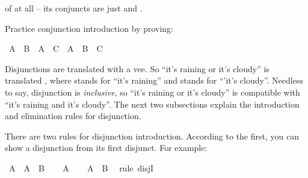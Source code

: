 \begin{isabellebody}
\begin{isamarkuptext}
of  at all -- its conjuncts are just  and .%
\end{isamarkuptext}\isamarkuptrue%
%
\begin{isamarkuptext}%
\begin{Exercise} Practice conjunction introduction by proving: \end{Exercise}%
\end{isamarkuptext}\isamarkuptrue%
\isamarkupfalse%
\ {\isachardoublequoteopen}{\isacharparenleft}A\ {\isasymlongrightarrow}\ B{\isacharparenright}\ {\isasymlongrightarrow}\ {\isacharparenleft}A\ {\isasymlongrightarrow}\ C{\isacharparenright}\ {\isasymlongrightarrow}\ A\ {\isasymlongrightarrow}\ B\ {\isasymand}\ C{\isachardoublequoteclose}%
\isadelimproof
\ %
\endisadelimproof
%
\isatagproof
{}\isamarkupfalse%
%
\endisatagproof
{\isafoldproof}%
%
\isadelimproof
%
\endisadelimproof
%
\isamarkuptrue%
%
\begin{isamarkuptext}%
Disjunctions are translated with a vee. So ``it's raining or it's cloudy'' is translated
, where  stands for ``it's raining'' and  stands for ``'it's cloudy''.
Needless to say, disjunction is \emph{inclusive}, so ``it's raining or it's cloudy'' is compatible with
``it's raining and it's cloudy''. The next two subsections explain the introduction and elimination
rules for disjunction.%
\end{isamarkuptext}\isamarkuptrue%
%
\isamarkuptrue%
%
\begin{isamarkuptext}%
There are two rules for disjunction introduction. According to the first, you can show a 
disjunction from its first disjunct. For example:%
\end{isamarkuptext}\isamarkuptrue%
\isamarkupfalse%
\ {\isachardoublequoteopen}A\ {\isasymlongrightarrow}\ A\ {\isasymor}\ B{\isachardoublequoteclose}\isanewline
%
\isadelimproof
%
\endisadelimproof
%
\isatagproof
{}\isamarkupfalse%
\isanewline
\ \ \isamarkupfalse%
\ {\isachardoublequoteopen}A{\isachardoublequoteclose}\isanewline
\ \ \isamarkupfalse%
\ {\isachardoublequoteopen}A\ {\isasymor}\ B{\isachardoublequoteclose}\ \isamarkupfalse%
\ {\isacharparenleft}rule\ disjI{}{\isacharparenright}\isanewline
{}\isamarkupfalse%
%
\endisatagproof
{\isafoldproof}%
%
\isadelimproof

\end{isabellebody}
